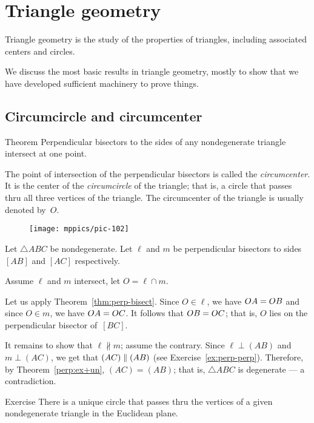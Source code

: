 \chapter{Triangle geometry}\label{chap:triangle}

Triangle geometry is the study of the properties of triangles, including associated centers and circles.

We discuss the most basic results in triangle geometry, 
mostly to show that we have developed sufficient machinery to prove things.

\section{Circumcircle and circumcenter}

\begin{thm}{Theorem}\label{thm:circumcenter}
Perpendicular bisectors to the sides of any nondegenerate triangle intersect at one point.
\end{thm}

The point of intersection of the perpendicular bisectors is called the \emph{circumcenter}.
It is the center of the \emph{circumcircle} of the triangle;
that is, a circle that passes thru all three vertices of the triangle.
The circumcenter of the triangle is usually denoted by~$O$.

\begin{wrapfigure}{o}{29mm}
\centering
\texttt{[image: mppics/pic-102]}
\end{wrapfigure}


Let $\triangle ABC$ be nondegenerate.
Let $\ell$ and $m$ be perpendicular bisectors to sides $[AB]$ and $[AC]$ respectively.

Assume $\ell$ and $m$ intersect,
let $O=\ell\cap m$.

Let us apply Theorem~\ref{thm:perp-bisect}.
Since $O\in\ell$, we have $OA=OB$ and since $O\in m$, we have $OA=OC$.
It follows that $OB=OC$;
that is, $O$ lies on the perpendicular bisector of~$[B C]$.

It remains to show that $\ell\nparallel m$;
assume the contrary.
Since
$\ell\perp(AB)$ and $m\perp (AC)$, we get that $(AC)\parallel (AB)$ 
(see Exercise~\ref{ex:perp-perp}).
Therefore, by Theorem~\ref{perp:ex+un}, $(AC)=(AB)$;
that is, $\triangle ABC$ is degenerate --- a contradiction.
\qeds

\begin{thm}{Exercise}\label{ex:unique-cline}
There is a unique circle that passes thru the vertices of a given nondegenerate triangle in the Euclidean plane. 
\end{thm}



